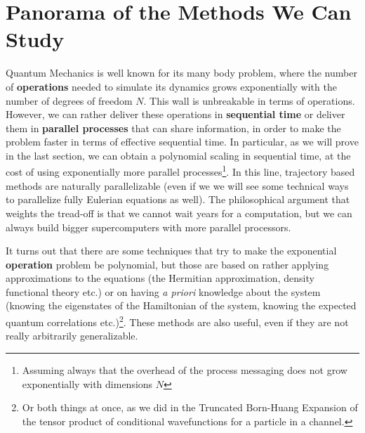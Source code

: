 \documentclass[11pt, a4paper]{article} %
\begin{document}
\section*{Panorama of the Methods We Can Study \vspace{-0.15cm}}
Quantum Mechanics is well known for its many body problem, where the number of {\bf operations} needed to simulate its dynamics grows exponentially with the number of degrees of freedom $N$. This wall is unbreakable in terms of operations. However, we can rather deliver these operations in {\bf sequential time} or deliver them in {\bf parallel processes} that can share information, in order to make the problem faster in terms of effective sequential time. In particular, as we will prove in the last section, we can obtain a polynomial scaling in sequential time, at the cost of using exponentially more parallel processes\footnote{Assuming always that the overhead of the process messaging does not grow exponentially with dimensions $N$}. In this line, trajectory based methods are naturally parallelizable (even if we we will see some technical ways to parallelize fully Eulerian equations as well). The philosophical argument that weights the tread-off is that we cannot wait years for a computation, but we can always build bigger supercomputers with more parallel processors.

It turns out that there are some techniques that try to make the exponential {\bf operation} problem be polynomial, but those are based on rather applying approximations to the equations (the Hermitian approximation, density functional theory etc.) or on having {\em a priori} knowledge about the system (knowing the eigenstates of the Hamiltonian of the system, knowing the expected quantum correlations etc.)\footnote{Or both things at once, as we did in the Truncated Born-Huang Expansion of the tensor product of conditional wavefunctions for a particle in a channel.}. These methods are also useful, even if they are not really arbitrarily generalizable.
\end{document}
